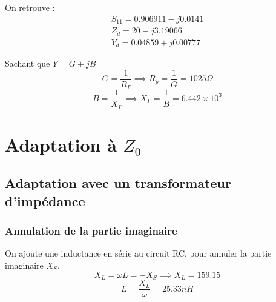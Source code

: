 \documentclass[a4paper]{article}
\begin{document}
\clearpage

On retrouve :
\begin{equation}
  \begin{split}
    S_{11} = 0.906911 - j 0.0141 \\
    Z_{d} = 20 - j 3.19066 \\
    Y_{d} = 0.04859 + j 0.00777
  \end{split}
\end{equation}

Sachant que $ Y = G + j B $
\[
G = \frac{1}{R_P} \implies R_p = \frac{1}{G} = 1025 \Omega
\]
\[
B = \frac{1}{X_P} \implies X_P = \frac{1}{B} = 6.442 \times 10^3
\]


\section{Adaptation \`a $Z_0$}

\subsection{Adaptation avec un transformateur d'imp\'edance}
\subsubsection{Annulation de la partie imaginaire}
On ajoute une inductance en s\'erie au circuit RC, pour annuler la partie imaginaire $X_S$.
\[
X_L = \omega L = - X_S \implies X_L = 159.15
\]
\[
L = \frac{X_L}{\omega} = 25.33 nH
\]
\end{document}
